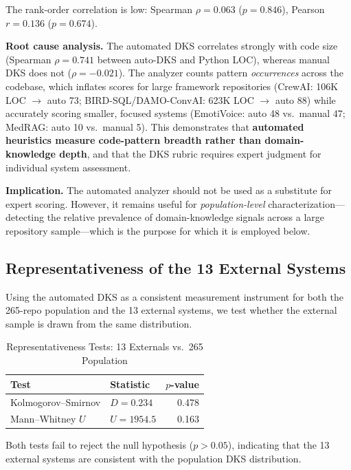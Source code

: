 \documentclass[10pt,a4paper]{article}
\begin{document}
The rank-order correlation is low: Spearman $\rho = 0.063$ ($p = 0.846$), Pearson $r = 0.136$ ($p = 0.674$).

\textbf{Root cause analysis.} The automated DKS correlates strongly with code size (Spearman $\rho = 0.741$ between auto-DKS and Python LOC), whereas manual DKS does not ($\rho = -0.021$). The analyzer counts pattern \emph{occurrences} across the codebase, which inflates scores for large framework repositories (CrewAI: 106K LOC $\to$ auto 73; BIRD-SQL/DAMO-ConvAI: 623K LOC $\to$ auto 88) while accurately scoring smaller, focused systems (EmotiVoice: auto 48 vs.\ manual 47; MedRAG: auto 10 vs.\ manual 5). This demonstrates that \textbf{automated heuristics measure code-pattern breadth rather than domain-knowledge depth}, and that the DKS rubric requires expert judgment for individual system assessment.

\textbf{Implication.} The automated analyzer should not be used as a substitute for expert scoring. However, it remains useful for \emph{population-level} characterization---detecting the relative prevalence of domain-knowledge signals across a large repository sample---which is the purpose for which it is employed below.

\subsection{Representativeness of the 13 External Systems}

Using the automated DKS as a consistent measurement instrument for both the 265-repo population and the 13 external systems, we test whether the external sample is drawn from the same distribution.

\begin{table}[h]
\centering
\caption{Representativeness Tests: 13 Externals vs.\ 265 Population}
\label{tab:representativeness}
\begin{tabular}{@{}llr@{}}
\toprule
\textbf{Test} & \textbf{Statistic} & \textbf{$p$-value} \\
\midrule
Kolmogorov--Smirnov & $D = 0.234$ & 0.478 \\
Mann--Whitney $U$ & $U = 1954.5$ & 0.163 \\
\bottomrule
\end{tabular}
\end{table}

Both tests fail to reject the null hypothesis ($p > 0.05$), indicating that the 13 external systems are consistent with the population DKS distribution.
\end{document}
